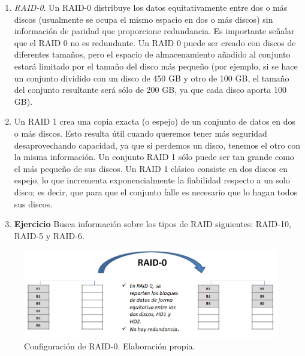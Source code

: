 \documentclass[
]{memoir}
\providecommand{\tightlist}{%
  \setlength{\itemsep}{0pt}\setlength{\parskip}{0pt}}
\begin{document}
\begin{enumerate}
  \begin{enumerate}
  \def\labelenumii{\alph{enumii}.}
  \tightlist
  \item
    \emph{RAID-0}. Un RAID-0 distribuye los datos equitativamente entre dos o más discos (usualmente se ocupa el mismo espacio en dos o más discos) sin información de paridad que proporcione redundancia. Es importante señalar que el RAID 0 no es redundante. Un RAID 0 puede ser creado con discos de diferentes tamaños, pero el espacio de almacenamiento añadido al conjunto estará limitado por el tamaño del disco más pequeño (por ejemplo, si se hace un conjunto dividido con un disco de 450 GB y otro de 100 GB, el tamaño del conjunto resultante será sólo de 200 GB, ya que cada disco aporta 100 GB).
  \item
    Un RAID 1 crea una copia exacta (o espejo) de un conjunto de datos en dos o más discos. Esto resulta útil cuando queremos tener más seguridad desaprovechando capacidad, ya que si perdemos un disco, tenemos el otro con la misma información. Un conjunto RAID 1 sólo puede ser tan grande como el más pequeño de sus discos. Un RAID 1 clásico consiste en dos discos en espejo, lo que incrementa exponencialmente la fiabilidad respecto a un solo disco; es decir, que para que el conjunto falle es necesario que lo hagan todos sus discos.
  \item
    \textbf{Ejercicio} Busca información sobre los tipos de RAID siguientes: RAID-10, RAID-5 y RAID-6.
  \end{enumerate}
\end{enumerate}

\begin{figure}

{\centering \includegraphics[width=0.9\linewidth]{images/raid0} 

}

\caption{Configuración de RAID-0. Elaboración propia.}\label{fig:rmarkdown}
\end{figure}
\end{document}
